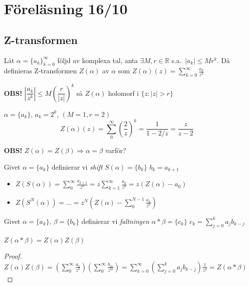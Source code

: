 \section{Föreläsning 16/10}
\subsection{Z-transformen}
\begin{definition}
Låt $\alpha = \{a_k\}_{k = 0}^\infty$ följd av komplexa tal, anta $\exists M, r \in \mathbb{R}$ s.a.\ $|a_k| \le Mr^k$. Då definieras Z-transformen $Z(\alpha)$ av $\alpha$ som $Z(\alpha)(z) = \displaystyle\sum_{k = 0}^\infty \frac{a_k}{z^k}$
\end{definition}

\textcolor{red!70!black}{\textbf{OBS!}} $\left| \dfrac{a_k}{z^k} \right| \le M\left( \dfrac{r}{|z|} \right)^k$ så $Z(\alpha)$ holomorf i $\{z : |z| > r\}$

\begin{example}
$\alpha = \{a_k\}$, $a_k = 2^k$, $(M = 1, r = 2)$
\[ Z(\alpha)(z) = \sum_0^\infty \left( \frac{2}{z} \right)^k = \frac{1}{1 - 2/z} = \frac{z}{z - 2} \]
\end{example}

\textcolor{red!70!black}{\textbf{OBS!}} $Z(\alpha) = Z(\beta) \Rightarrow \alpha = \beta$ \quad \textcolor{magenta!80!black}{varför?}

\begin{definition}
Givet $\alpha = \{a_k\}$ definierar vi \emph{shift} $S(\alpha) = \{b_k\}$ \quad $b_k = a_{k+1}$
\end{definition}
\begin{itemize}
  \item $Z(S(\alpha)) = \displaystyle\sum_0^\infty \frac{a_{k+1}}{z^k} = z\sum_{k = 1}^\infty \frac{a_k}{z^k} = z(Z(\alpha) - a_0)$
  \item $Z(S^N(\alpha)) = \dots = z^N\left( Z(\alpha) - \displaystyle\sum_0^{N-1} \frac{a_k}{z^k} \right)$
\end{itemize}

\begin{definition}
Givet $\alpha = \{a_k\}$, $\beta = \{b_k\}$ definierar vi \emph{faltningen} $\alpha * \beta = \{c_k\}$ \quad $c_k = \displaystyle\sum_{j = 0}^k a_j b_{k-j}$
\end{definition}

\begin{theorem}[Proposition 4.1F]
$Z(\alpha * \beta) = Z(\alpha)Z(\beta)$
\end{theorem}
\begin{proof}
$Z(\alpha)Z(\beta) = \left( \displaystyle\sum_0^\infty \frac{a_k}{z^k} \right)\left( \sum_0^\infty \frac{b_m}{z^m} \right) = \sum_{k = 0}^\infty \left( \sum_{j = 0}^k a_j b_{k-j} \right) \frac{1}{z^k} = Z(\alpha * \beta)$
\end{proof}

